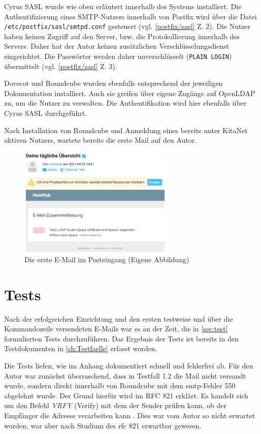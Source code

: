 Cyrus SASL wurde wie oben erläutert innerhalb des Systems installiert. 
Die Authentifizierung eines SMTP-Nutzers innerhalb von Postfix wird über die Datei\\\verb+/etc/postfix/sasl/smtpd.conf+ gesteuert (vgl. \autoref{postfix/sasl} Z. 2). 
Die Nutzer haben keinen Zugriff auf den Server, bzw. die Protokollierung innerhalb des Servers.
Daher hat der Autor keinen zusätzlichen Verschlüsselungsdienst eingerichtet. 
Die Passwörter werden daher unverschlüsselt (\verb+PLAIN LOGIN+) übermittelt (vgl. \autoref{postfix/sasl} Z. 3). 

Dovecot und Roundcube wurden ebenfalls entsprechend der jeweiligen Dokumentation installiert. Auch sie greifen über eigene Zugänge auf OpenLDAP zu, um die Nutzer zu verwalten. Die Authentifikation wird hier ebenfalls über Cyrus SASL durchgeführt.

Nach Installation von Roundcube und Anmeldung eines bereits unter KitaNet aktiven Nutzers, wartete bereits die erste Mail auf den Autor.

\begin{figure}[H]
  \centering
  \includegraphics[width=0.65\textwidth]{res/erste Mail.png}
  \caption{Die erste E-Mail im Posteingang (Eigene Abbildung)}
  \label{fig:Mail}
\end{figure}

\section{Tests}{}
Nach der erfolgreichen Einrichtung und den ersten testweise und über die Kommandozeile versendeten E-Mails war es an der Zeit, die in \autoref{sec:test} formulierten Tests durchzuführen. Das Ergebnis der Tests ist bereits in den Testdokumenten in \autoref{ch:Testfaelle} erfasst worden.

Die Tests liefen, wie im Anhang dokumentiert schnell und fehlerfrei ab. Für den Autor war zunächst überraschend, dass in Testfall 1.2 die Mail nicht versandt wurde, sondern direkt innerhalb von Roundcube mit dem \ac{smtp}-Fehler 550 abgelehnt wurde. 
Der Grund hierfür wird im RFC 821 erklärt. 
Es handelt sich um den Befehl \textit{VRFY} (Verify) mit dem der Sender prüfen kann, ob der Empfänger die Adresse verarbeiten kann \citep[vgl.][8]{rfc821}.
Dies war vom Autor so nicht erwartet worden, war aber nach Studium des \ac{rfc} 821 erwartbar gewesen.

